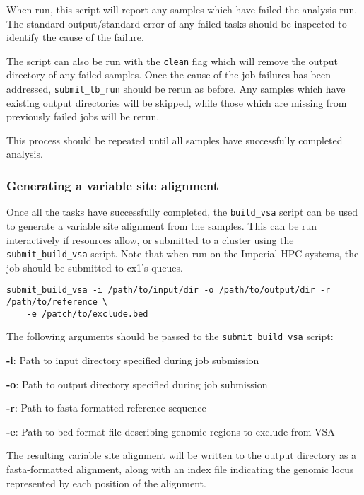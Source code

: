 \documentclass[a4paper,10pt,twoside]{article}
\newenvironment{tight_itemize}{
\begin{itemize}
  \setlength{\itemsep}{0pt}
  \setlength{\parskip}{0pt}
}{\end{itemize}}
\begin{document}
When run, this script will report any samples which have failed the analysis
run. The standard output/standard error of any failed tasks should be inspected
to identify the cause of the failure. 

The script can also be run with the {\tt clean} flag which will remove the
output directory of any failed samples. Once the cause of the job failures has
been addressed, {\tt submit\_tb\_run} should be rerun as before. Any samples which
have existing output directories will be skipped, while those which are missing
from previously failed jobs will be rerun. 

This process should be repeated until all samples have successfully completed analysis.

\subsubsection{Generating a variable site alignment}

Once all the tasks have successfully completed, the {\tt build\_vsa} script can
be used to generate a variable site alignment from the samples. This can be run
interactively if resources allow, or submitted to a cluster using the {\tt
submit\_build\_vsa} script. Note that when run on the Imperial HPC systems, the
job should be submitted to cx1's queues.

\begin{Verbatim}
submit_build_vsa -i /path/to/input/dir -o /path/to/output/dir -r /path/to/reference \
	-e /patch/to/exclude.bed
\end{Verbatim}

The following arguments should be passed to the {\tt submit\_build\_vsa} script:

\begin{tight_itemize}
\item \textbf{-i}: Path to input directory specified during job submission
\item \textbf{-o}: Path to output directory specified during job submission
\item \textbf{-r}: Path to fasta formatted reference sequence
\item \textbf{-e}: Path to bed format file describing genomic regions to exclude from VSA
\end{tight_itemize}

The resulting variable site alignment will be written to the output directory
as a fasta-formatted alignment, along with an index file indicating the genomic
locus represented by each position of the alignment.
\end{document}
